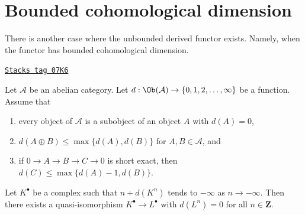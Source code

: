\section{Bounded cohomological dimension}
\label{derived-section-bounded}
There is another case where the unbounded derived functor exists.
Namely, when the functor has bounded cohomological dimension.

\begin{lemma}
\label{derived-lemma-replace-resolution}
\href{https://stacks.math.columbia.edu/tag/07K6}{\texttt{Stacks tag 07K6}}

Let $\mathcal{A}$ be an abelian category. Let
$d : \Ob(\mathcal{A}) \to \{0, 1, 2, \ldots, \infty\}$ be a function.
Assume that
\begin{enumerate}
\item every object of $\mathcal{A}$ is a subobject of an
object $A$ with $d(A) = 0$,
\item $d(A \oplus B) \leq \max \{d(A), d(B)\}$ for $A, B \in \mathcal{A}$, and
\item if $0 \to A \to B \to C \to 0$ is short exact, then
$d(C) \leq \max\{d(A) - 1, d(B)\}$.
\end{enumerate}
Let $K^\bullet$ be a complex such that $n + d(K^n)$ tends to $-\infty$
as $n \to -\infty$. Then there exists a quasi-isomorphism
$K^\bullet \to L^\bullet$ with $d(L^n) = 0$ for all $n \in \mathbf{Z}$.
\end{lemma}

